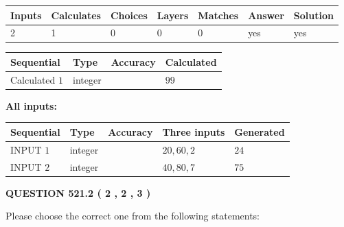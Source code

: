 \documentclass[12pt]{article}
\begin{document}
 
\noindent{}
 
 

 
   
   
   
   
\noindent\begin{tabular}{|l|l|l|l|l|l|l|}
 \hline
Inputs & Calculates & Choices & Layers & Matches & Answer & Solution \\ \hline
 2  & 
 1  & 
 0
  & 
 0  & 
 0  & 
  yes & 
  yes 
  \\ \hline
 \end{tabular}
   
   
   
   
\noindent{}
   
   
  
  
\noindent\begin{tabular}{|l|l|l|l|}
\hline
 Sequential & Type & Accuracy & Calculated \\ 
\hline
 
 
  Calculated $  1 $ & integer &  & 
  $ 99 $ 
 \\  \hline  
 \end{tabular}
   
   
   
   
\noindent\vspace{0.1in}\hspace{-0.08in} {\textbf{\Large{All inputs: }}}
   
   
  
  
\noindent\begin{tabular}{|l|l|l|l|l|}
\hline
 Sequential & Type & Accuracy & Three inputs & Generated \\ 
\hline
 
 
  INPUT $  1 $ & integer &  & $
 20
 , 
 60
 , 
 2
 $ & $ 24 $ 
 \\  \hline  
 
 
  INPUT $  2 $ & integer &  & $
 40
 , 
 80
 , 
 7
 $ & $ 75 $ 
 \\  \hline  
 \end{tabular}
   
   
  
\vspace{0.2in}
  
{\textbf{\Large{QUESTION
521.2 
 ( 2 , 2 , 3 )
}}}
  
  
Please choose the correct one from the following statements:
 
\end{document}
